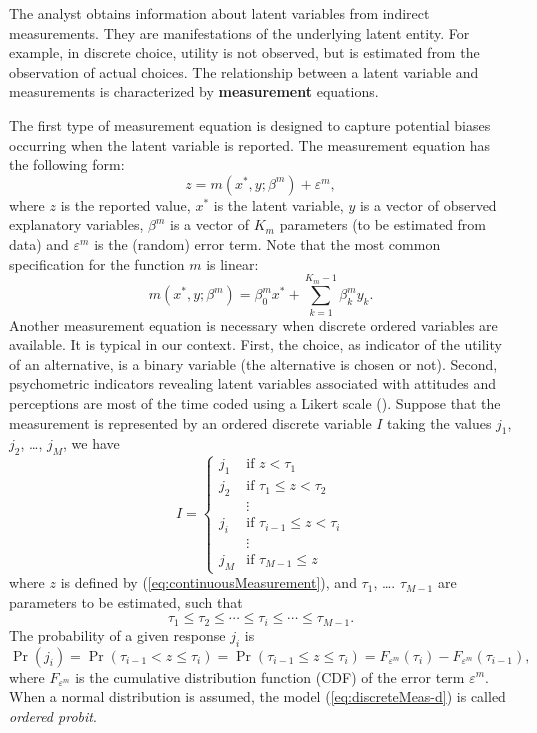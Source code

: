 \documentclass[12pt,a4paper]{article}
\newcommand{\req}[1]{(\ref{#1})}
\newcommand{\prob}{\operatorname{Pr}}
\begin{document}
The analyst obtains information about latent variables from indirect
measurements. They are manifestations of the underlying latent
entity.  For example, in discrete choice, utility is not observed, but
is estimated from the observation of actual choices. The relationship
between a latent variable and measurements is characterized by 
\textbf{measurement} equations.


The first type of measurement equation is designed to capture
potential biases occurring  when the latent variable is
reported. 
The measurement equation has the following form:
\begin{equation}
\label{eq:continuousMeasurement}
z = m(x^*,y;\beta^m) + \varepsilon^m,
\end{equation}
where $z$ is the reported value, $x^*$ is the latent variable, $y$ is a vector of observed explanatory
variables, $\beta^m$ is
a vector of $K_m$ parameters (to be estimated from data) and $\varepsilon^m$
is the (random) error term. Note that the most common specification
for the function $m$ is linear:
\begin{equation}
m(x^*,y;\beta^m) = \beta^m_0 x^* + \sum_{k=1}^{K_m-1} \beta^m_k y_k.
\end{equation}
Another measurement equation is necessary when  discrete ordered
variables are available. It is typical in our context. First, the
choice, as indicator of the utility of an alternative, is a binary
variable (the alternative is chosen or not).  Second, psychometric
indicators revealing latent variables associated with attitudes and
perceptions are most of the time coded using a Likert scale (\cite{likert1932technique}).
Suppose that the measurement is represented by an ordered discrete variable $I$
taking the values $j_1$, $j_2$, \ldots , $j_M$,  we have 
\begin{equation}
\label{eq:discreteMeas-b}
I = \left\{
\begin{array}{ll}
j_1 & \text{if } z < \tau_1 \\
j_2 & \text{if } \tau_1 \leq z < \tau_2 \\
& \vdots \\
j_i & \text{if } \tau_{i-1} \leq z < \tau_i \\
& \vdots \\
j_M & \text{if } \tau_{M-1} \leq z
\end{array}
\right.
\end{equation}
where $z$ is defined by \req{eq:continuousMeasurement}, and $\tau_1$, \ldots. $\tau_{M-1}$ are parameters to be estimated,
such that
\begin{equation}
\label{eq:discreteMeas-c}
\tau_1 \leq \tau_2 \leq \cdots \leq \tau_i \leq \cdots \leq \tau_{M-1}. 
\end{equation}
The probability of a given response $j_i$ is
\begin{equation}
\label{eq:discreteMeas-d}
\prob(j_i) = \prob(\tau_{i-1} < z \leq \tau_i) =  \prob(\tau_{i-1} \leq z \leq \tau_i) =
F_{\varepsilon^m}(\tau_i) - F_{\varepsilon^m}(\tau_{i-1}),
\end{equation}
where $F_{\varepsilon^m}$ is the cumulative distribution function
(CDF) of the error term $\varepsilon^m$. When a normal
distribution is assumed, the model \req{eq:discreteMeas-d} is called \emph{ordered probit}. 
\end{document}
